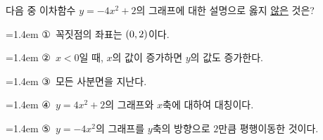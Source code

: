다음 중 이차함수 $y=-4x^2+2$의 그래프에 대한 설명으로 옳지 \underline{않은} 것은?
\par\medskip\par\noindent\hangindent=1.4em {\small ①}\ 꼭짓점의 좌표는 $(0{,}\mkern3mu 2)$이다.\par\noindent\hangindent=1.4em {\small ②}\ $x<0$일 때, $x$의 값이 증가하면 $y$의 값도 증가한다.\par\noindent\hangindent=1.4em {\small ③}\ 모든 사분면을 지난다.\par\noindent\hangindent=1.4em {\small ④}\ $y=4x^2+2$의 그래프와 $x$축에 대하여 대칭이다.\par\noindent\hangindent=1.4em {\small ⑤}\ $y=-4x^2$의 그래프를 $y$축의 방향으로 $2$만큼 평행이동한 것이다.\par\medskip
